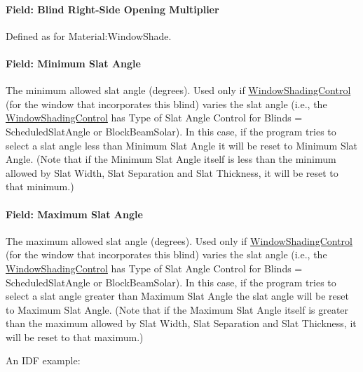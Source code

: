 \paragraph{Field: Blind Right-Side Opening Multiplier}\label{field-blind-right-side-opening-multiplier}

Defined as for Material:WindowShade.

\paragraph{Field: Minimum Slat Angle}\label{field-minimum-slat-angle}

The minimum allowed slat angle (degrees). Used only if \hyperref[windowpropertyshadingcontrol]{WindowShadingControl} (for the window that incorporates this blind) varies the slat angle (i.e., the \hyperref[windowpropertyshadingcontrol]{WindowShadingControl} has Type of Slat Angle Control for Blinds = ScheduledSlatAngle or BlockBeamSolar). In this case, if the program tries to select a slat angle less than Minimum Slat Angle it will be reset to Minimum Slat Angle. (Note that if the Minimum Slat Angle itself is less than the minimum allowed by Slat Width, Slat Separation and Slat Thickness, it will be reset to that minimum.)

\paragraph{Field: Maximum Slat Angle}\label{field-maximum-slat-angle}

The maximum allowed slat angle (degrees). Used only if \hyperref[windowpropertyshadingcontrol]{WindowShadingControl} (for the window that incorporates this blind) varies the slat angle (i.e., the \hyperref[windowpropertyshadingcontrol]{WindowShadingControl} has Type of Slat Angle Control for Blinds = ScheduledSlatAngle or BlockBeamSolar). In this case, if the program tries to select a slat angle greater than Maximum Slat Angle the slat angle will be reset to Maximum Slat Angle. (Note that if the Maximum Slat Angle itself is greater than the maximum allowed by Slat Width, Slat Separation and Slat Thickness, it will be reset to that maximum.)

An IDF example:

